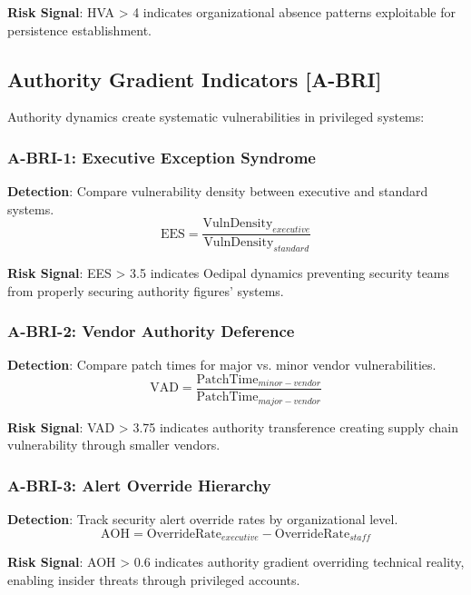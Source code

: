 \documentclass[11pt,a4paper]{article}
\begin{document}
\textbf{Risk Signal}: HVA > 4 indicates organizational absence patterns exploitable for persistence establishment.

\subsection{Authority Gradient Indicators [A-BRI]}

Authority dynamics create systematic vulnerabilities in privileged systems:

\subsubsection{A-BRI-1: Executive Exception Syndrome}
\textbf{Detection}: Compare vulnerability density between executive and standard systems.
\begin{equation}
\text{EES} = \frac{\text{VulnDensity}_{executive}}{\text{VulnDensity}_{standard}}
\end{equation}

\textbf{Risk Signal}: EES > 3.5 indicates Oedipal dynamics preventing security teams from properly securing authority figures' systems.

\subsubsection{A-BRI-2: Vendor Authority Deference}
\textbf{Detection}: Compare patch times for major vs. minor vendor vulnerabilities.
\begin{equation}
\text{VAD} = \frac{\text{PatchTime}_{minor-vendor}}{\text{PatchTime}_{major-vendor}}
\end{equation}

\textbf{Risk Signal}: VAD > 3.75 indicates authority transference creating supply chain vulnerability through smaller vendors.

\subsubsection{A-BRI-3: Alert Override Hierarchy}
\textbf{Detection}: Track security alert override rates by organizational level.
\begin{equation}
\text{AOH} = \text{OverrideRate}_{executive} - \text{OverrideRate}_{staff}
\end{equation}

\textbf{Risk Signal}: AOH > 0.6 indicates authority gradient overriding technical reality, enabling insider threats through privileged accounts.
\end{document}
